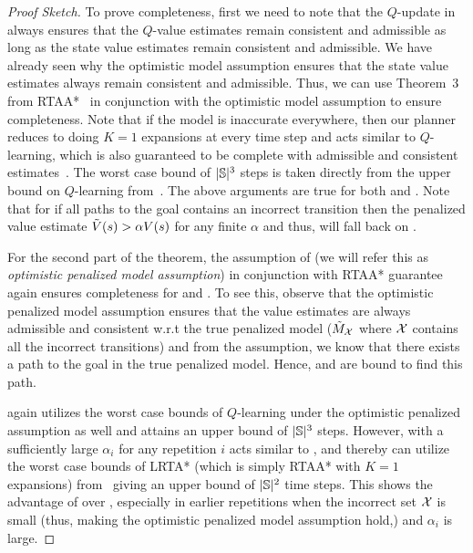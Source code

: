       \begin{proof}[Proof Sketch]
	To prove completeness, first we need to note that the $Q$-update in
\cmaxpp{} always ensures that the $Q$-value estimates remain
consistent and admissible as long as the state value estimates remain
consistent and admissible. We have already seen why the optimistic
model assumption ensures that the state value estimates always remain
consistent and admissible. Thus, we can use Theorem~3 from
RTAA*~\cite{DBLP:conf/atal/KoenigL06} in conjunction with the
optimistic model assumption to ensure completeness. Note that if the
model is inaccurate everywhere, then our planner reduces to doing
$K=1$ expansions at every time step and acts similar to $Q$-learning,
which is also guaranteed to be complete with admissible and consistent
estimates~\cite{DBLP:conf/aaai/KoenigS93}. The worst case bound of
$|\mathbb{S}|^3$ steps is taken directly from the upper bound on
$Q$-learning from~\cite{DBLP:conf/aaai/KoenigS93}. The above arguments
are true for both \cmaxpp{} and \acmaxpp{}. Note that for \acmaxpp{}
if all paths to the goal contains an incorrect transition then the
penalized value estimate $\tilde{V}(s) > \alpha V(s)$ for any finite
$\alpha$ and thus, will fall back on \cmaxpp{}.


For the second part of the theorem, the assumption of \cmax{} (we will
refer this as \textit{optimistic penalized model assumption}) in
conjunction with RTAA* guarantee again ensures completeness for
\cmaxpp{} and \acmaxpp{}. To see this, observe that the optimistic
penalized model assumption ensures that the value estimates are always
admissible and consistent w.r.t the true penalized model
($\tilde{M}_{\mathcal{X}}$ where $\mathcal{X}$ contains all the
incorrect transitions) and from the assumption, we know that there
exists a path to the goal in the true penalized model. Hence,
\cmaxpp{} and \acmaxpp{} are bound to find this path.


\cmaxpp{} again utilizes the worst case bounds of $Q$-learning under
the optimistic penalized assumption as well and attains an upper bound
of $|\mathbb{S}|^3$ steps. However, \acmaxpp{} with a sufficiently
large $\alpha_i$ for any repetition $i$ acts similar to \cmax{}, and
thereby can utilize the worst case bounds of LRTA* (which is simply
RTAA* with $K=1$ expansions) from~\cite{DBLP:conf/aaai/KoenigS93}
giving an upper bound of $|\mathbb{S}|^2$ time steps. This shows the
advantage of \acmaxpp{} over \cmaxpp{}, especially in earlier
repetitions when the incorrect set $\mathcal{X}$ is small (thus,
making the optimistic penalized model assumption hold,) and $\alpha_i$
is large.
        \end{proof}
